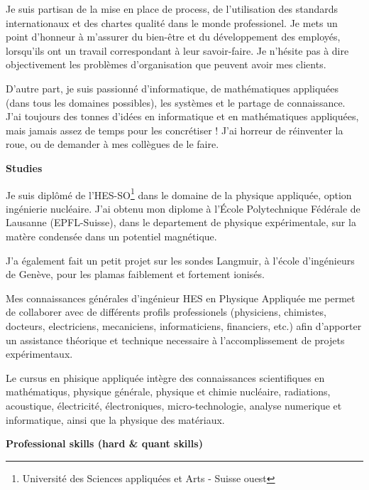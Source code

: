 	Je suis partisan de la mise en place de process, de l'utilisation des standards internationaux et des chartes qualité dans le monde professionel. Je mets un point d'honneur à m'assurer du bien-être et du développement des employés, lorsqu'ils ont un travail correspondant à leur savoir-faire. Je n'hésite pas à dire objectivement les problèmes d'organisation que peuvent avoir mes clients.
	
	D'autre part, je suis passionné d'informatique, de mathématiques appliquées (dans tous les domaines possibles), les systèmes et le partage de connaissance. J'ai toujours des tonnes d'idées en informatique et en mathématiques appliquées, mais jamais assez de temps pour les concrétiser ! J'ai horreur de réinventer la roue, ou de demander à mes collègues de le faire.

\textbf{Studies}	

	Je suis diplômé de l'HES-SO\footnote{Université des Sciences appliquées et Arts - Suisse ouest} dans le domaine de la physique appliquée, option ingénierie nucléaire. J'ai obtenu mon diplome à l'École Polytechnique Fédérale de Lausanne (EPFL-Suisse), dans le departement de physique expérimentale, sur la matère condensée dans un potentiel magnétique.
	
	 J'a également fait un petit projet sur les sondes Langmuir, à l'école d'ingénieurs de Genève, pour les plamas faiblement et fortement ionisés.
	
	Mes connaissances générales d'ingénieur HES en Physique Appliquée me permet de collaborer avec de différents profils professionels (physiciens, chimistes, docteurs, electriciens, mecaniciens, informaticiens, financiers, etc.) afin d'apporter un assistance théorique et technique necessaire à l'accomplissement de projets expérimentaux.

	Le cursus en phisique appliquée intègre des connaissances scientifiques en mathématiqus, physique générale, physique et chimie nucléaire, radiations, acoustique, électricité, électroniques, micro-technologie, analyse numerique et informatique, ainsi que la physique des matériaux.

\textbf{Professional skills (hard \& quant skills)}

